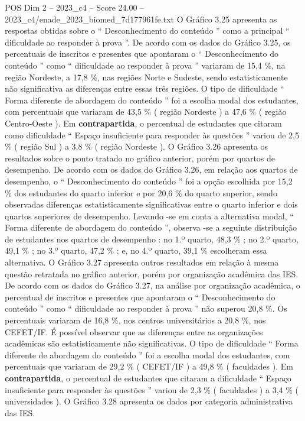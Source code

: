 \begin{textsample}{POS Dim 2 – 2023\_c4 – Score 24.00 – 2023\_c4/enade\_2023\_biomed\_7d177961fe.txt}
O Gráfico 3.25 apresenta as respostas obtidas sobre o “ Desconhecimento do conteúdo ” como a principal “ dificuldade ao responder à prova ”.
De acordo com os dados do Gráfico 3.25, os percentuais de inscritos e presentes que apontaram o “ Desconhecimento do conteúdo ” como “ dificuldade ao responder à prova ” variaram de 15,4 \%, na região Nordeste, a 17,8 \%, nas regiões Norte e Sudeste, sendo estatisticamente não significativa as diferenças entre essas três regiões.
O tipo de dificuldade “ Forma diferente de abordagem do conteúdo ” foi a escolha modal dos estudantes, com percentuais que variaram de 43,5 \% ( região Nordeste ) a 47,6 \% ( região Centro-Oeste ).
Em \textbf{contrapartida}, o percentual de estudantes que citaram como dificuldade “ Espaço insuficiente para responder às questões ” variou de 2,5 \% ( região Sul ) a 3,8 \% ( região Nordeste ).
O Gráfico 3.26 apresenta os resultados sobre o ponto tratado no gráfico anterior, porém por quartos de desempenho.
De acordo com os dados do Gráfico 3.26, em relação aos quartos de desempenho, o “ Desconhecimento do conteúdo ” foi a opção escolhida por 15,2 \% dos estudantes do quarto inferior e por 20,6 \% do quarto superior, sendo observadas diferenças estatisticamente significativas entre o quarto inferior e dois quartos superiores de desempenho.
Levando -se em conta a alternativa modal, “ Forma diferente de abordagem do conteúdo ”, observa -se a seguinte distribuição de estudantes nos quartos de desempenho : no 1.º quarto, 48,3 \% ; no 2.º quarto, 49,1 \% ; no 3.º quarto, 47,2 \% ; e, no 4.º quarto, 39,1 \% escolheram essa alternativa.
O Gráfico 3.27 apresenta outros resultados em relação à mesma questão retratada no gráfico anterior, porém por organização acadêmica das IES.
De acordo com os dados do Gráfico 3.27, na análise por organização acadêmica, o percentual de inscritos e presentes que apontaram o “ Desconhecimento do conteúdo ” como “ dificuldade ao responder à prova ” não superou 20,8 \%.
Os percentuais variaram de 16,8 \%, nos centros universitários a 20,8 \%, nos CEFET/IF.
É possível observar que as diferenças entre as organizações acadêmicas são estatisticamente não significativas.
O tipo de dificuldade “ Forma diferente de abordagem do conteúdo ” foi a escolha modal dos estudantes, com percentuais que variaram de 29,2 \% ( CEFET/IF ) a 49,8 \% ( faculdades ).
Em \textbf{contrapartida}, o percentual de estudantes que citaram a dificuldade “ Espaço insuficiente para responder às questões ” variou de 2,3 \% ( faculdades ) a 3,4 \% ( universidades ).
O Gráfico 3.28 apresenta os dados por categoria administrativa das IES.

\end{textsample}
